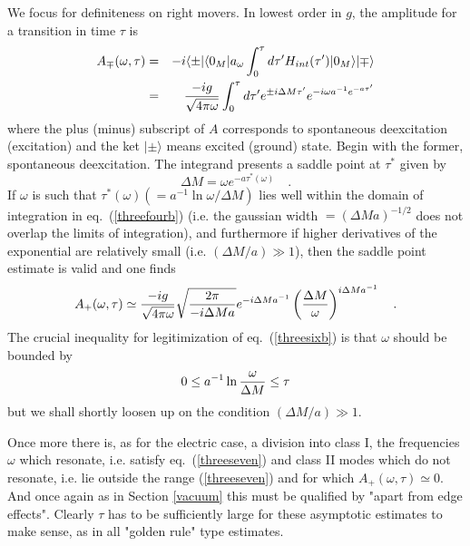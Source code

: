 \documentclass[12pt,oneside]{report}
\def\ket#1{|#1\rangle}
\def\bra#1{\langle #1|}
\def\elematrice#1#2#3{\langle #1|#2|#3 \rangle}
\def\om{\omega	}
\def\p {\prime}
\begin{document}
We focus for definiteness on right
movers. In lowest order in $g$, the amplitude for a transition in time
$\tau$ is \begin{eqnarray}
A_\mp (\om, \tau) &=& -i \bra{\pm} \elematrice{0_M}{ a_\om \int_0^\tau d\tau^\p
H_{int}(\tau^\p) }{0_M}\ket{\mp}\nonumber\\
&=& {-i g \over \sqrt{4 \pi \om}} \int_0^\tau d\tau^\prime
e^{\pm i \Delta M \tau^\prime} e^{-i \om a^{-1} e^{-a \tau^\prime}}
\label{threefourb}
\end{eqnarray}
where  the plus (minus) subscript of $A$ corresponds to  
spontaneous deexcitation
(excitation) and the ket $\ket{\pm}$ means excited (ground) state. Begin
with the former, spontaneous deexcitation. The integrand presents 
a saddle point at $\tau^*$ given by
\begin{equation}
\Delta M = \om e^{-a \tau^*(\om) }
\quad .\label{threefiveb}
\end{equation}
If $\om$ is such that $\tau^*(\om) (=a^{-1} \ln \om / \Delta M)$
lies well within the domain of integration in eq.~(\ref{threefourb}) (i.e. the
gaussian width $ =(\Delta M a)^{-1/2}$ does not overlap the limits of
integration), and furthermore if higher derivatives of the exponential are
relatively small (i.e. $ (\Delta M / a) \gg 1$), then the saddle point
estimate is valid and one finds \begin{equation}
A_+(\om, \tau) \simeq {-i g \over \sqrt{4 \pi \om}} \sqrt{2 \pi
\over -i \Delta M a}
e^{- i \Delta M a^{-1}} \left ( {\Delta M \over \om} \right)^{i \Delta M
a^{-1}} \quad .\label{threesixb}
\end{equation}
The crucial inequality for legitimization of eq.~(\ref{threesixb}) is 
that $\om$ should be bounded by
\begin{equation}
0 \leq a^{-1} \ln {\om \over \Delta M} \leq \tau
\label{threeseven}
\end{equation}
but we shall shortly loosen up on the condition $
(\Delta M / a) \gg 1$.

Once more there is, as for the electric case, a division into class I, the
frequencies $\om$
which resonate, i.e. satisfy eq.~(\ref{threeseven}) and class II modes which do
not resonate, i.e. lie outside the range (\ref{threeseven}) and for which
$A_+(\om,\tau)\simeq 0$.  And once again as in Section \ref{vacuum} this must be
qualified by "apart from edge effects". Clearly $\tau$ has to be sufficiently
large for these asymptotic estimates to make sense, as in all "golden rule" type
estimates.
\end{document}
